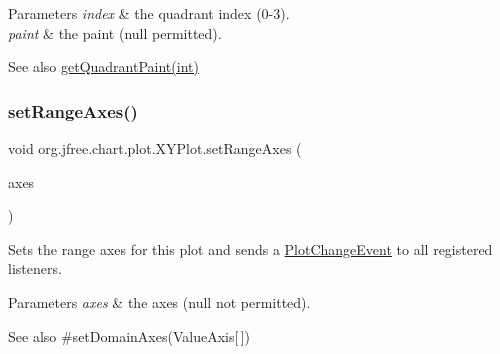 \begin{DoxyParams}{Parameters}
{\em index} & the quadrant index (0-\/3). \\
\hline
{\em paint} & the paint ({\ttfamily null} permitted).\\
\hline
\end{DoxyParams}
\begin{DoxySeeAlso}{See also}
\mbox{\hyperlink{classorg_1_1jfree_1_1chart_1_1plot_1_1_x_y_plot_a20b4caa204dbf0f23b6d1400185baa97}{get\+Quadrant\+Paint(int)}} 
\end{DoxySeeAlso}
\mbox{\label{classorg_1_1jfree_1_1chart_1_1plot_1_1_x_y_plot_a37fecbfc1de0d02d1785b80afc96b5e2}} 
\subsubsection{\texorpdfstring{set\+Range\+Axes()}{setRangeAxes()}}
{\footnotesize\ttfamily void org.\+jfree.\+chart.\+plot.\+X\+Y\+Plot.\+set\+Range\+Axes (\begin{DoxyParamCaption}\item[{\mbox{\hyperlink{classorg_1_1jfree_1_1chart_1_1axis_1_1_value_axis}{Value\+Axis}} \mbox{[}$\,$\mbox{]}}]{axes }\end{DoxyParamCaption})}

Sets the range axes for this plot and sends a \mbox{\hyperlink{}{Plot\+Change\+Event}} to all registered listeners.


\begin{DoxyParams}{Parameters}
{\em axes} & the axes ({\ttfamily null} not permitted).\\
\hline
\end{DoxyParams}
\begin{DoxySeeAlso}{See also}
\#set\+Domain\+Axes(\+Value\+Axis\mbox{[}$\,$\mbox{]}) 
\end{DoxySeeAlso}
\mbox{\label{classorg_1_1jfree_1_1chart_1_1plot_1_1_x_y_plot_ad1e4454ba3a7289dd46f705fbd0db983}} 
